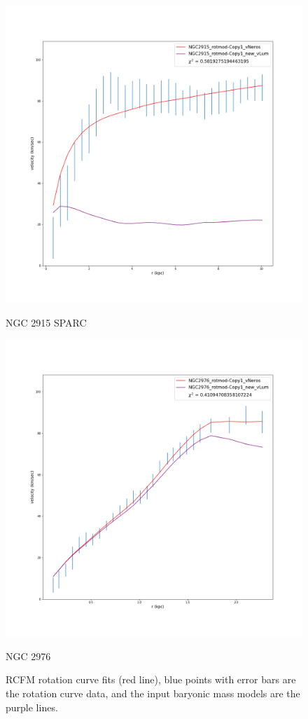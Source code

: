 \documentclass[reprint,%
 amsmath,amssymb,
 aps,
]{revtex4-1}
\begin{document}
 
\begin{figure} 
\centering
\begin{minipage}{0.5\textwidth}
\includegraphics[width=0.95\linewidth]{Updated_Graphs_withnewcolorsandfonts/NGC2915_rotmod-Copy1_XueSofue.png}
\caption{NGC 2915 SPARC\cite{2016Lelli}}
\label{fig:2915}
\end{minipage}
\begin{minipage}{0.5\textwidth}
\includegraphics[width=0.95\linewidth]{Updated_Graphs_withnewcolorsandfonts/NGC2976_rotmod-Copy1_XueSofue.png}
\caption{NGC 2976}
\label{fig:2976}
\end{minipage}
\caption{RCFM rotation curve fits (red line), blue points with error bars are the rotation curve data, and the input baryonic mass models are the purple lines. }
\end{figure}
  
\end{document}
